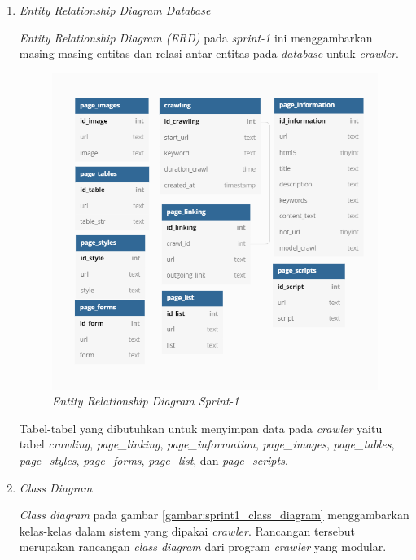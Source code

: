 \begin{enumerate}
	
	\item{\textit{Entity Relationship Diagram Database}}
	
	\textit{Entity Relationship Diagram (ERD)} pada \textit{sprint-1} ini menggambarkan masing-masing entitas dan relasi antar entitas pada \textit{database} untuk \textit{crawler}.
	
	\begin{figure}[H]
	\centering
	\includegraphics[keepaspectratio, width=13cm]{gambar/sprint1_erd}
	\caption{\textit{Entity Relationship Diagram Sprint-1}}
	\label{gambar:sprint1_erd}
	\end{figure}
	
	Tabel-tabel yang dibutuhkan untuk menyimpan data pada \textit{crawler} yaitu tabel \textit{crawling}, \textit{page\_linking}, \textit{page\_information}, \textit{page\_images}, \textit{page\_tables}, \textit{page\_styles}, \textit{page\_forms}, \textit{page\_list}, dan \textit{page\_scripts}.
	
	\item{\textit{Class Diagram}}
	
	\textit{Class diagram} pada gambar \ref{gambar:sprint1_class_diagram} menggambarkan kelas-kelas dalam sistem yang dipakai \textit{crawler}. Rancangan tersebut merupakan rancangan \textit{class diagram} dari program \textit{crawler} yang modular.
	

\end{enumerate}
